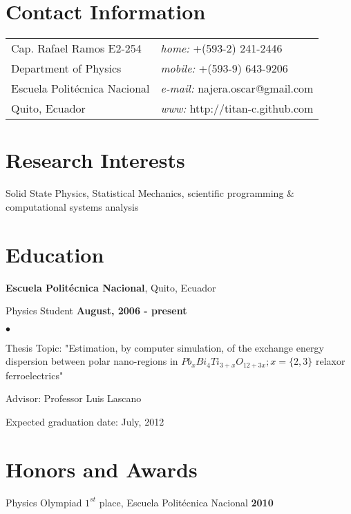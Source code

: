 \documentclass[margin,line]{res}
\newenvironment{list1}{
  \begin{list}{\ding{113}}{%
      \setlength{\itemsep}{0in}
      \setlength{\parsep}{0in} \setlength{\parskip}{0in}
      \setlength{\topsep}{0in} \setlength{\partopsep}{0in} 
      \setlength{\leftmargin}{0.17in}}}{\end{list}}
\newenvironment{list2}{
  \begin{list}{$\bullet$}{%
      \setlength{\itemsep}{0in}
      \setlength{\parsep}{0in} \setlength{\parskip}{0in}
      \setlength{\topsep}{0in} \setlength{\partopsep}{0in} 
      \setlength{\leftmargin}{0.2in}}}{\end{list}}
\begin{document}

\begin{resume}
\section{\sc Contact Information}
\vspace{.05in}
\begin{tabular}{@{}p{2in}p{4in}}
Cap. Rafael Ramos E2-254	& {\it home:}  +(593-2) 241-2446 \\            
Department of Physics		& {\it mobile:} +(593-9) 643-9206 \\         
Escuela Politécnica Nacional	& {\it e-mail:}  najera.oscar@gmail.com\\       
Quito, Ecuador			& {\it www:} http://titan-c.github.com \\     
\end{tabular}


\section{\sc Research Interests}
Solid State Physics, Statistical Mechanics, scientific programming \&
computational systems analysis

\section{\sc Education}
{\bf Escuela Politécnica Nacional}, Quito, Ecuador\\
\vspace*{-.1in}
\begin{list1}
\item[] Physics Student \hfill {\bf August, 2006 - present}\\
\begin{list2}
\vspace*{.05in}
\item Thesis Topic:  "Estimation, by computer simulation, of the exchange energy dispersion between polar nano-regions in $Pb_xBi_4Ti_{3+x}O_{12+3x}; x=\{2,3\}$ relaxor ferroelectrics"
\item Advisor: Professor Luis Lascano
\item Expected graduation date: July, 2012
\end{list2}
\end{list1}

\section{\sc Honors and Awards}
Physics Olympiad $1^{st}$ place, Escuela Politécnica Nacional \hfill {\bf 2010}


\end{resume}
\end{document}
